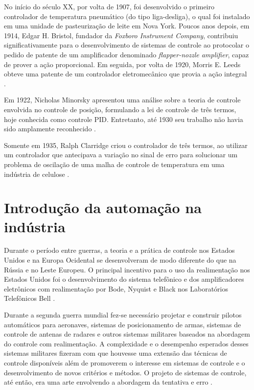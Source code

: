No início do século XX, por volta de 1907, foi desenvolvido o primeiro
controlador de temperatura pneumático (do tipo liga-desliga), o qual foi
instalado em uma unidade de pasteurização de leite em Nova York. Poucos anos
depois, em 1914, Edgar H. Bristol, fundador da {\it Foxboro Instrument Company},
contribuiu significativamente para o desenvolvimento de sistemas de controle ao
protocolar o pedido de patente de um amplificador denominado {\it flapper-nozzle
amplifier}, capaz de prover a ação proporcional. Em seguida, por volta de 1920,
Morris E. Leeds obteve uma patente de um controlador eletromecânico que provia a
ação integral \cite{faccin:2004}.

Em 1922, Nicholas Minorsky apresentou uma análise sobre a teoria de controle
envolvida no controle de posição, formulando a lei de controle de três termos,
hoje conhecida como controle PID.  Entretanto, até 1930 seu trabalho não havia
sido amplamente reconhecido \cite{bennett:1996}.

Somente em 1935, Ralph Clarridge criou o controlador de três termos, ao utilizar
um controlador que antecipava a variação no sinal de erro para solucionar um
problema de oscilação de uma malha de controle de temperatura em uma indústria
de celulose \cite{faccin:2004}.

\section{Introdução da automação na indústria}
Durante o período entre guerras, a teoria e a prática de controle nos Estados
Unidos e na Europa Ocidental se desenvolveram de modo diferente do que na Rússia
e no Leste Europeu. O principal incentivo para o uso da realimentação nos
Estados Unidos foi o desenvolvimento do sistema telefônico e dos amplificadores
eletrônicos com realimentação por Bode, Nyquist e Black nos Laboratórios
Telefônicos Bell \cite{dorf:2009}.

Durante a segunda guerra mundial fez-se necessário projetar e construir pilotos
automáticos para aeronaves, sistemas de posicionamento de armas, sistemas de
controle de antenas de radares e outros sistemas militares baseados na abordagem
do controle com realimentação. A complexidade e o desempenho esperados desses
sistemas militares fizeram com que houvesse uma extensão das técnicas de
controle disponíveis além de promoverem o interesse em sistemas de controle e o
desenvolvimento de novos critérios e métodos. O projeto de sistemas de controle,
até então, era uma arte envolvendo a abordagem da tentativa e erro
\cite{dorf:2009}.

